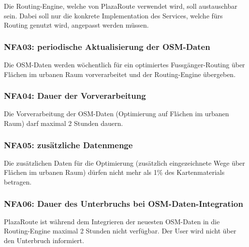 Die \gls{Routing-Engine}, welche von PlazaRoute verwendet wird, soll austauschbar sein. Dabei soll nur die konkrete Implementation des Services, welche fürs Routing genutzt wird, angepasst werden müssen.

\subsubsection{NFA03: periodische Aktualisierung der OSM-Daten}
\label{NFA:NFA03}

Die \ac{OSM}-Daten werden wöchentlich für ein optimiertes Fussgänger-Routing über Flächen im urbanen Raum vorverarbeitet und der Routing-Engine übergeben.


\subsubsection{NFA04: Dauer der Vorverarbeitung}
\label{NFA:NFA04}

Die Vorverarbeitung der \ac{OSM}-Daten (Optimierung auf Flächen im urbanen Raum) darf maximal 2 Stunden dauern.

\subsubsection{NFA05: zusätzliche Datenmenge}
\label{NFA:NFA05}

Die zusätzlichen Daten für die Optimierung (zusätzlich eingezeichnete Wege über Flächen im urbanen Raum) dürfen nicht mehr als 1\% des Kartenmaterials betragen.

\subsubsection{NFA06: Dauer des Unterbruchs bei OSM-Daten-Integration}
\label{NFA:NFA06}

PlazaRoute ist während dem Integrieren der neuesten \ac{OSM}-Daten in die \gls{Routing-Engine} maximal 2 Stunden nicht verfügbar. Der User wird nicht über den Unterbruch informiert.
